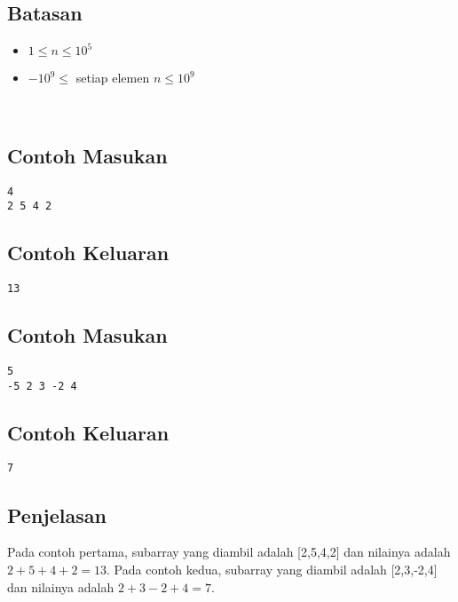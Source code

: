 \documentclass{article}
\begin{document}
\subsection*{Batasan}

\begin{itemize}
    \setlength\itemsep{0pt}
    \item $1 \leq n \leq 10^5$
    \item $-10^9 \leq $ setiap elemen $n \leq 10^9$
\end{itemize}
\\
\begin{multicols}{2}
\subsection*{Contoh Masukan}
\begin{lstlisting}
4
2 5 4 2
\end{lstlisting}
\columnbreak
\subsection*{Contoh Keluaran}
\begin{lstlisting}
13
\end{lstlisting}
\vfill
\null
\end{multicols}

\begin{multicols}{2}
\subsection*{Contoh Masukan}
\begin{lstlisting}
5
-5 2 3 -2 4
\end{lstlisting}
\columnbreak
\subsection*{Contoh Keluaran}
\begin{lstlisting}
7
\end{lstlisting}
\vfill
\null
\end{multicols}
\subsection*{Penjelasan}
Pada contoh pertama, subarray yang diambil adalah [2,5,4,2] dan nilainya adalah $2+5+4+2 = 13$.
Pada contoh kedua, subarray yang diambil adalah [2,3,-2,4] dan nilainya adalah $2+3-2+4 = 7$.

\pagebreak
\end{document}
